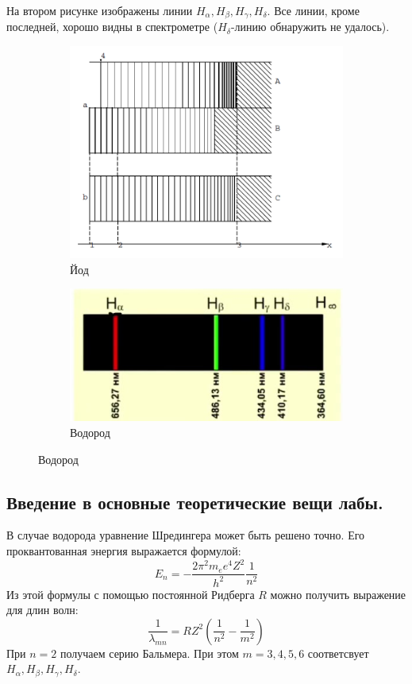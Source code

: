 \documentclass[%
 reprint,
 amsmath,amssymb,
 aps,
]{revtex4-2}
\begin{document}
 На втором рисунке изображены линии $H_\alpha, H_\beta, H_\gamma, H_\delta$. Все линии, кроме последней, хорошо видны в спектрометре ($H_\delta$-линию обнаружить не удалось).
\begin{figure}[]
	\begin{subfigure}{0.3\textwidth}
		\includegraphics[scale=0.3]{1.png}
		\caption{Йод}
	\end{subfigure}
	\begin{subfigure}{0.3\textwidth}
		\includegraphics[scale=0.3]{2.png}
		\caption{Водород}
	\end{subfigure}
\end{figure}
\subsection{Введение в основные теоретические вещи лабы.}

В случае водорода уравнение Шредингера может быть решено точно. Его проквантованная энергия выражается формулой:
\begin{equation}
E_n= -\frac{2\pi^2m_ee^4Z^2}{h^2}\frac{1}{n^2}
\end{equation}
Из этой формулы с помощью постоянной Ридберга $R$ можно получить выражение для длин волн:
\begin{equation}
\frac{1}{\lambda_{mn}} = RZ^2\left(\frac{1}{n^2} - \frac{1}{m^2} \right)
\end{equation}
При $n=2$ получаем серию Бальмера. При этом $m=3,4,5,6$ соответсвует $H_\alpha, H_\beta, H_\gamma, H_\delta$.
\end{document}
